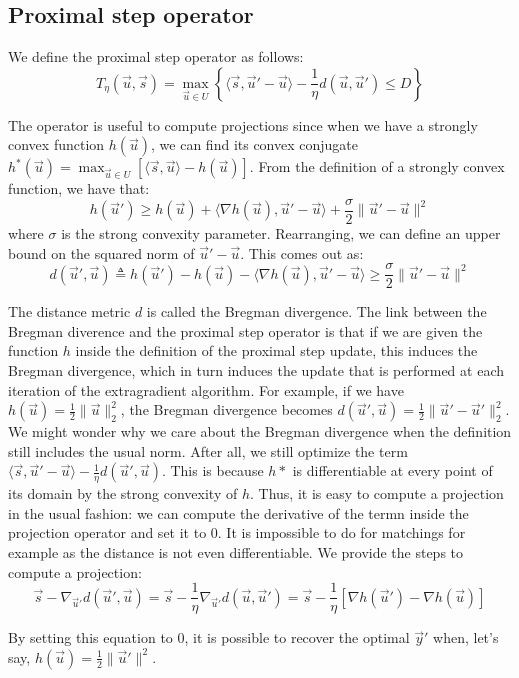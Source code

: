 \subsection*{Proximal step operator} \label{proxstep}
We define the proximal step operator as follows:
\begin{equation}
  {T}_{\eta}(\vec u, \vec s) = \max_{\vec u \in {U}} \left \{
\langle \vec s, \vec u' - \vec u \rangle - \frac{1}{\eta} d(\vec u, \vec u')
\leq D \right \}
\end{equation}

The operator is useful to compute projections since when we have a strongly
convex function $h(\vec u)$, we can find its convex conjugate $h^*(\vec u) =
\max_{\vec u \in {U}} \left [ \langle \vec s, \vec u \rangle - h(\vec u)
\right ]$. From the definition of a strongly convex function, we have that:
\begin{equation}
  h(\vec u') \geq h(\vec u) + \langle \nabla h(\vec u), \vec u' - \vec u \rangle
+ \frac{\sigma}{2} \lVert \vec u' - \vec u \rVert^2
\end{equation}
where $\sigma$ is the strong convexity parameter. Rearranging, we can define an
upper bound on the squared norm of $\vec u' - \vec u$. This comes out as:
\begin{equation}
  d(\vec u', \vec u) \triangleq h(\vec u') - h(\vec u) - \langle \nabla h(\vec u), \vec u' - \vec u \rangle \geq \frac{\sigma}{2} \lVert \vec u' - \vec u \rVert^2
\end{equation}

The distance metric $d$ is called the Bregman divergence. The link between the
Bregman diverence and the proximal step operator is that if we are given the
function $h$ inside the definition of the proximal step update, this induces the
Bregman divergence, which in turn induces the update that is performed at each
iteration of the extragradient algorithm. For example, if we have $h(\vec u) =
\frac{1}{2} \lVert \vec u \rVert_2^2 $, the Bregman divergence becomes $d(\vec
u', \vec u) = \frac{1}{2} \lVert \vec u' - \vec u' \rVert_2^2$. We might wonder
why we care about the Bregman divergence when the definition still includes the
usual norm. After all, we still optimize the term $\langle \vec s, \vec u' -
\vec u \rangle - \frac{1}{\eta} d(\vec u', \vec u)$. This is because $h*$ is
differentiable at every point of its domain by the strong convexity of $h$.
Thus, it is easy to compute a projection in the usual fashion: we can compute
the derivative of the termn inside the projection operator and set it to 0. It
is impossible to do for matchings for example as the distance is not even
differentiable. We provide the steps to compute a projection:
\begin{equation}
  \vec s - \nabla_{\vec u'} d(\vec u', \vec u) = \vec s - \frac{1}{\eta}
\nabla_{\vec u'} d(\vec u, \vec u') = \vec s - \frac{1}{\eta} \left [\nabla
h(\vec u') - \nabla h(\vec u) \right]
\end{equation}

By setting this equation to 0, it is possible to recover the optimal $\vec y'$
when, let's say, $h(\vec u) = \frac{1}{2} \lVert \vec u' \rVert^2$.

